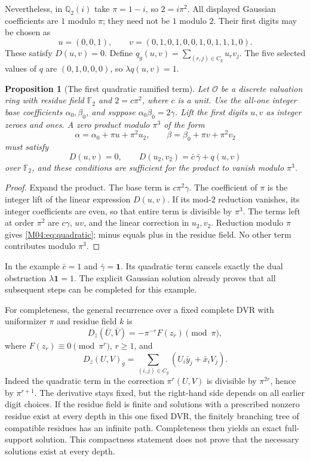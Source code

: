 \documentclass[11pt,a4paper,oneside]{report}
\newtheorem{proposition}[theorem]{Proposition}
\theoremstyle{definition}
\theoremstyle{remark}
\newcommand{\Q}{\mathbb Q}
\newcommand{\F}{\mathbb F}
\newcommand{\OO}{\mathcal O}
\newcommand{\one}{\mathbf 1}
\begin{document}
Nevertheless, in $\Q_2(i)$ take $\pi=1-i$, so $2=i\pi^2$.
All displayed Gaussian coefficients are $1$ modulo $\pi$; they need
not be $1$ modulo $2$. Their first digits may be chosen as
\[
u=(0,0,1),\qquad
v=(0,1,0,1,0,0,1,0,1,1,1,0).
\]
These satisfy $D(u,v)=0$. Define
$q_g(u,v)=\sum_{(r,j)\in C_g}u_rv_j$. The five selected values of
$q$ are $(0,1,0,0,0)$, so $\lambda q(u,v)=1$.

\begin{proposition}[The first quadratic ramified term]\label{M04:prop:ramified}
Let $\OO$ be a discrete valuation ring with residue field $\F_2$ and
$2=c\pi^2$, where $c$ is a unit. Use the all-one integer base
coefficients $\alpha_0,\beta_0$, and suppose
$\alpha_0\beta_0=2\gamma$. Lift the first digits $u,v$ as integer
zeroes and ones. A zero product modulo $\pi^3$ of the form
\[
\alpha=\alpha_0+\pi u+\pi^2u_2,
\qquad \beta=\beta_0+\pi v+\pi^2v_2
\]
must satisfy
\begin{equation}\label{M04:eq:quadratic}
D(u,v)=0,\qquad
D(u_2,v_2)=\bar c\,\bar\gamma+q(u,v)
\end{equation}
over $\F_2$, and these conditions are sufficient for the product to
vanish modulo $\pi^3$.
\end{proposition}
\begin{proof}
Expand the product. The base term is $c\pi^2\gamma$. The coefficient
of $\pi$ is the integer lift of the linear expression $D(u,v)$.
If its mod-$2$ reduction vanishes, its integer coefficients are even,
so that entire term is divisible by $\pi^3$. The terms left at order
$\pi^2$ are $c\gamma$, $uv$, and the linear correction in $u_2,v_2$.
Reduction modulo $\pi$ gives \eqref{M04:eq:quadratic}; minus equals plus
in the residue field. No other term contributes modulo $\pi^3$.
\end{proof}

In the example $\bar c=1$ and $\bar\gamma=\one$. Its quadratic term
cancels exactly the dual obstruction $\lambda\one=1$. The explicit
Gaussian solution already proves that all subsequent steps can be
completed for this example.

For completeness, the general recurrence over a fixed complete DVR
with uniformizer $\pi$ and residue field $k$ is
\begin{equation}\label{M04:eq:dvr}
D_{\bar z}(\bar U,\bar V)
=-\pi^{-r}F(z_r)\pmod\pi,
\end{equation}
where $F(z_r)\equiv0\pmod{\pi^r}$, $r\ge1$, and
\[
D_{\bar z}(U,V)_g
=\sum_{(i,j)\in C_g}(U_i\bar y_j+\bar x_iV_j).
\]
Indeed the quadratic term in the correction $\pi^r(U,V)$ is
divisible by $\pi^{2r}$, hence by $\pi^{r+1}$. The derivative stays
fixed, but the right-hand side depends on all earlier digit choices.
If the residue field is finite and solutions with a prescribed nonzero
residue exist at every depth in this one fixed DVR, the finitely
branching tree of compatible residues has an infinite path. Completeness
then yields an exact full-support solution. This compactness statement
does not prove that the necessary solutions exist at every depth.
\end{document}
